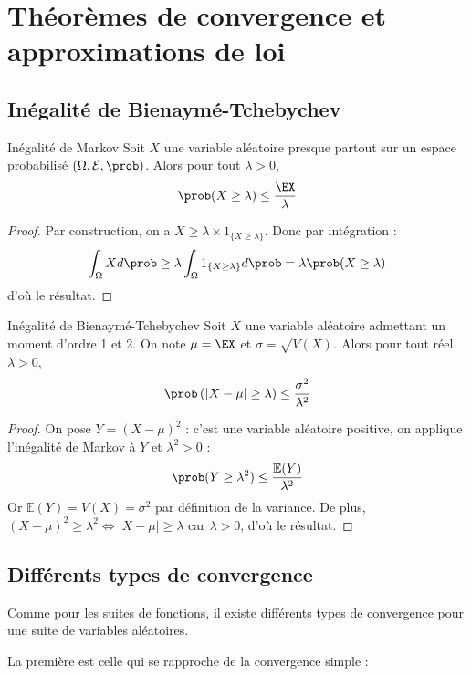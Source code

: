 \section{Théorèmes de convergence et approximations de loi}
\subsection{Inégalité de Bienaymé-Tchebychev}
		
\begin{proposition}{Inégalité de Markov}{}
			Soit $X$ une variable aléatoire  presque partout sur un espace probabilisé $(\Omega,\mathcal{E},\prob)$. Alors pour tout $\lambda >0$, 
			$$\prob(X \geq \lambda) \leq \frac{\EX}{\lambda}$$
\end{proposition}
\begin{proof}
			Par construction, on a $X  \geq \lambda \times 1_{\{X \geq \lambda\}}$. Donc par intégration :
			$$\int_{\Omega}^{} X d\prob \geq \lambda \int_{\Omega}^{} 1_{\{X \geq \lambda\}} d\prob = \lambda \prob(X \geq \lambda)$$
			d'où le résultat.
\end{proof}
		
\begin{proposition}{Inégalité de Bienaymé-Tchebychev}{}
			Soit $X$ une variable aléatoire admettant un moment d'ordre 1 et 2. On note $\mu = \EX$ et $\sigma = \sqrt{V(X)}$. Alors pour tout réel $\lambda >0$, 
			$$\prob\left(|X-\mu| \geq \lambda \right) \leq \frac{\sigma^2}{\lambda^2}$$
\end{proposition}
\begin{proof}
			On pose $Y=(X-\mu)^2$ : c'est une variable aléatoire positive, on applique l'inégalité de Markov à $Y$ et $\lambda^2 >0$ :
			$$\prob(Y \geq \lambda^2) \leq \frac{\mathbb{E}(Y)}{\lambda^2}$$
			Or $\mathbb{E}(Y)=V(X)=\sigma^2$ par définition de la variance. De plus, $(X-\mu)^2 \geq \lambda^2 \iff |X-\mu| \geq \lambda$ car $\lambda >0$, d'où le résultat.
\end{proof}
		

\subsection{Différents types de convergence}
		
Comme pour les suites de fonctions, il existe différents types de convergence pour une suite de variables aléatoires.
		
La première est celle qui se rapproche de la convergence simple :
		
